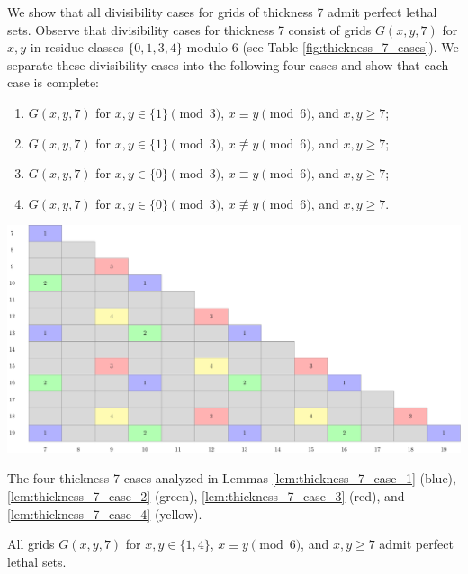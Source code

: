 We show that all divisibility cases for grids of thickness 7 admit perfect lethal sets. Observe that divisibility cases for thickness 7 consist of grids $G(x,y,7)$ for $x,y$ in residue classes $\{0,1,3,4\}$ modulo 6 (see Table \ref{fig:thickness_7_cases}). We separate these divisibility cases into the following four cases and show that each case is complete:
\begin{enumerate}
\item $G(x,y,7)$ for $x,y \in \{1\} \pmod 3$, $x \equiv y \pmod 6$, and $x,y \geq 7$;
\item $G(x,y,7)$ for $x,y \in \{1\} \pmod 3$, $x \not\equiv y \pmod 6$, and $x,y \geq 7$;
\item $G(x,y,7)$ for $x,y \in \{0\} \pmod 3$, $x \equiv y \pmod 6$, and $x,y \geq 7$;
\item $G(x,y,7)$ for $x,y \in \{0\} \pmod 3$, $x \not\equiv y \pmod 6$, and $x,y \geq 7$.
\end{enumerate}

\begin{table}[]
\centering
\includegraphics[width=\textwidth]{tables/4/thickness_7_cases.pdf}
\caption{The four thickness 7 cases analyzed in Lemmas \ref{lem:thickness_7_case_1} (blue), \ref{lem:thickness_7_case_2} (green), \ref{lem:thickness_7_case_3} (red), and \ref{lem:thickness_7_case_4} (yellow).}
\label{fig:thickness_7_cases}
\end{table}

\begin{lem}
\label{lem:thickness_7_case_1}
All grids $G(x,y,7)$ for $x,y \in \{1,4\}$, $x \equiv y \pmod 6$, and $x,y \geq 7$ admit perfect lethal sets.
\end{lem}

